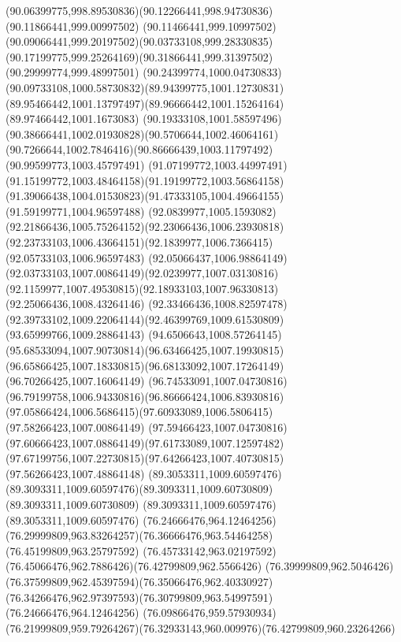 {    \curveto(90.06399775,998.89530836)(90.12266441,998.94730836)(90.11866441,999.00997502)
    \curveto(90.11466441,999.10997502)(90.09066441,999.20197502)(90.03733108,999.28330835)
    \curveto(90.17199775,999.25264169)(90.31866441,999.31397502)(90.29999774,999.48997501)
    \curveto(90.24399774,1000.04730833)(90.09733108,1000.58730832)(89.94399775,1001.12730831)
    \curveto(89.95466442,1001.13797497)(89.96666442,1001.15264164)(89.97466442,1001.1673083)
    \curveto(90.19333108,1001.58597496)(90.38666441,1002.01930828)(90.5706644,1002.46064161)
    \curveto(90.7266644,1002.7846416)(90.86666439,1003.11797492)(90.99599773,1003.45797491)
    \curveto(91.07199772,1003.44997491)(91.15199772,1003.48464158)(91.19199772,1003.56864158)
    \curveto(91.39066438,1004.01530823)(91.47333105,1004.49664155)(91.59199771,1004.96597488)
    \curveto(92.0839977,1005.1593082)(92.21866436,1005.75264152)(92.23066436,1006.23930818)
    \curveto(92.23733103,1006.43664151)(92.1839977,1006.7366415)(92.05733103,1006.96597483)
    \curveto(92.05066437,1006.98864149)(92.03733103,1007.00864149)(92.0239977,1007.03130816)
    \curveto(92.1159977,1007.49530815)(92.18933103,1007.96330813)(92.25066436,1008.43264146)
    \curveto(92.33466436,1008.82597478)(92.39733102,1009.22064144)(92.46399769,1009.61530809)
    \lineto(93.65999766,1009.28864143)
    \curveto(94.6506643,1008.57264145)(95.68533094,1007.90730814)(96.63466425,1007.19930815)
    \curveto(96.65866425,1007.18330815)(96.68133092,1007.17264149)(96.70266425,1007.16064149)
    \curveto(96.74533091,1007.04730816)(96.79199758,1006.94330816)(96.86666424,1006.83930816)
    \curveto(97.05866424,1006.5686415)(97.60933089,1006.5806415)(97.58266423,1007.00864149)
    \curveto(97.59466423,1007.04730816)(97.60666423,1007.08864149)(97.61733089,1007.12597482)
    \curveto(97.67199756,1007.22730815)(97.64266423,1007.40730815)(97.56266423,1007.48864148)
    \moveto(89.3053311,1009.60597476)
    \curveto(89.3093311,1009.60597476)(89.3093311,1009.60730809)(89.3093311,1009.60730809)
    \lineto(89.3093311,1009.60597476)
    \lineto(89.3053311,1009.60597476)
    \moveto(76.24666476,964.12464256)
    \curveto(76.29999809,963.83264257)(76.36666476,963.54464258)(76.45199809,963.25797592)
    \curveto(76.45733142,963.02197592)(76.45066476,962.7886426)(76.42799809,962.5566426)
    \curveto(76.39999809,962.5046426)(76.37599809,962.45397594)(76.35066476,962.40330927)
    \curveto(76.34266476,962.97397593)(76.30799809,963.54997591)(76.24666476,964.12464256)
    \moveto(76.09866476,959.57930934)
    \curveto(76.21999809,959.79264267)(76.32933143,960.009976)(76.42799809,960.23264266)
}

